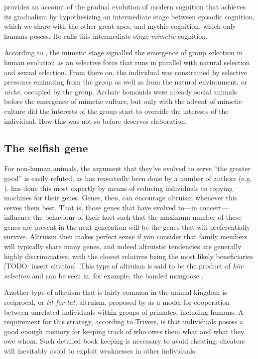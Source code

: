 \documentclass{article}
\begin{document}
\citet{donald1991} provides an account of the gradual evolution of modern
cognition that achieves its gradualism by hypothesizing an intermediate stage
between episodic cognition, which we share with the other great apes, and
mythic cognition, which only humans posess. He calls this intermediate stage
\textit{mimetic} cognition.

According to \citet{donald1991}, the mimetic stage signalled the emergence of
group selection in human evolution as an selective force that runs in parallel
with natural selection and sexual selection. From there on, the individual was
constrained by selective pressures eminating from the group as well as from
the natural environment, or \emph{niche}, occupied by the group. Archaic
homonids were already social animals before the emergence of mimetic culture,
but only with the advent of mimetic culture did the interests of the group
start to override the interests of the individual. How this was not so before
deserves elaboration.

\subsection{The selfish gene}
\label{sec:genes}

For non-human animals, the argument that they've evolved to serve “the greater
good” is easily refuted, as has repeatedly been done by a number of authors
(e.g. \citealp{dawkins1976,}). \citet{dawkins1976} has done this most expertly by
means of reducing individuals to copying machines for their genes. Genes, then,
can encourage altruism whenever this serves them best. That is, those genes
that have evolved to---in concert---influence the behaviour of their host such
that the maximum number of these genes are present in the next generation will
be the genes that will preferentially survive. Altruism then makes perfect
sense if you consider that family members will typically share many genes, and
indeed altruistic tendencies are generally highly discriminative, with the
closest relatives being the most likely beneficiaries [TODO: insert citation]. This
type of altruism is said to be the product of \emph{kin-selection} and can
be seen in, for example, the banded mongoose \citep{gilchrist2004a,
gilchrist2004b, hodge2005}.

Another type of altruism that is fairly common in the animal kingdom is
reciprocal, or \emph{tit-for-tat}, altruism, proposed by \citet{trivers1971}
as a model for cooperation between unrelated individuals within groups
of primates, including humans. A requirement for this strategy, according to
Trivers, is that individuals posess a good enough memory for keeping track of who
owes them what and what they owe whom. Such detailed book keeping is necessary
to avoid cheating; cheaters will inevitably avoid to exploit weaknesses in
other individuals.
\end{document}
